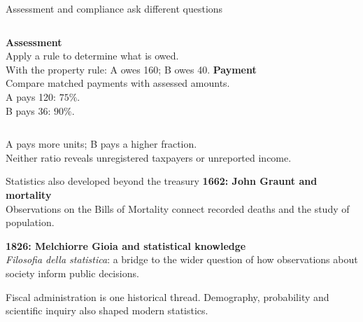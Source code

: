 \begin{frame}{Assessment and compliance ask different questions}
\small
\begin{columns}[T]
\textbf{Assessment}\\
Apply a rule to determine what is owed.\\[2mm]
With the property rule: A owes 160; B owes 40.
\textbf{Payment}\\
Compare matched payments with assessed amounts.\\[2mm]
A pays 120: $75\%$.\\
B pays 36: $90\%$.
\end{columns}
\par\vspace{3mm}
A pays more units; B pays a higher fraction.\\
Neither ratio reveals unregistered taxpayers or unreported income.
\end{frame}

\begin{frame}{Statistics also developed beyond the treasury}
\textbf{1662: John Graunt and mortality}\\
Observations on the Bills of Mortality connect recorded deaths and the study of population.
\par\vspace{4mm}
\textbf{1826: Melchiorre Gioia and statistical knowledge}\\
\textit{Filosofia della statistica}: a bridge to the wider question of how observations about society inform public decisions.
\par\vspace{4mm}
Fiscal administration is one historical thread. Demography, probability and scientific inquiry also shaped modern statistics.
\end{frame}

